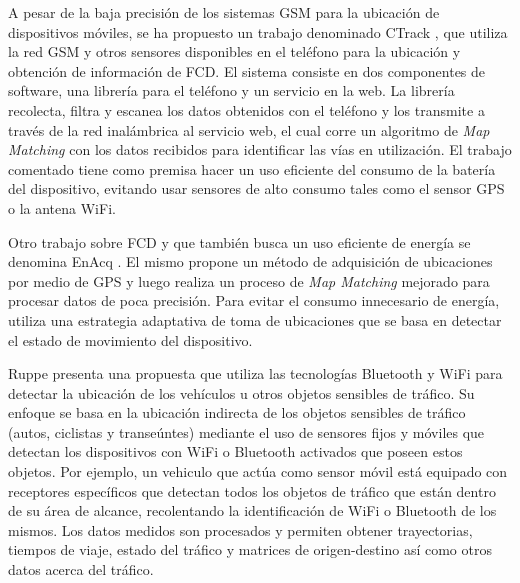 A pesar de la baja precisión de los sistemas GSM para la ubicación de dispositivos móviles, se ha propuesto un trabajo denominado CTrack \cite{thiagarajan2011accurate}, que utiliza la red GSM y otros sensores disponibles en el teléfono para la ubicación y obtención de información de FCD. El sistema consiste en dos componentes de software, una librería para el teléfono y un servicio en la web. La librería recolecta, filtra y escanea los datos obtenidos con el teléfono y los transmite a través de la red inalámbrica al servicio web, el cual corre un algoritmo de \emph{Map Matching} con los datos recibidos para identificar las vías en utilización. El trabajo comentado tiene como premisa hacer un uso eficiente del consumo de la batería del dispositivo, evitando usar sensores de alto consumo tales como el sensor GPS o la antena WiFi.

Otro trabajo sobre FCD y que también busca un uso eficiente de energía se denomina EnAcq \cite{fang2011enacq}. El mismo propone un método de adquisición de ubicaciones por medio de GPS y luego realiza un proceso de \emph{Map Matching} mejorado para procesar datos de poca precisión. Para evitar el consumo innecesario de energía, utiliza una estrategia adaptativa de toma de ubicaciones que se basa en detectar el estado de movimiento del dispositivo.

Ruppe\cite{ruppe2012augmenting} presenta una propuesta que utiliza las tecnologías Bluetooth y WiFi para detectar la ubicación de los vehículos u otros objetos sensibles de tráfico. Su enfoque se basa en la ubicación indirecta de los objetos sensibles de tráfico (autos, ciclistas y transeúntes) mediante el uso de sensores fijos y móviles que detectan los dispositivos con WiFi o Bluetooth activados que poseen estos objetos. Por ejemplo, un vehiculo que actúa como sensor móvil está equipado con receptores específicos que detectan todos los objetos de tráfico que están dentro de su área de alcance, recolentando la identificación de WiFi o Bluetooth de los mismos. Los datos medidos son procesados y permiten obtener trayectorias, tiempos de viaje, estado del tráfico y matrices de origen-destino así como otros datos acerca del tráfico.
